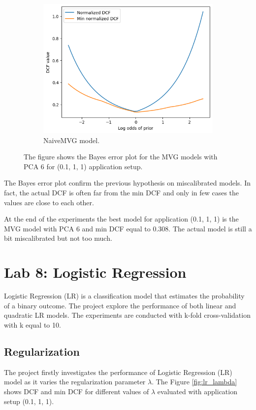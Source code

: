 \documentclass{article}
\begin{document}
\begin{figure}[ht]
\begin{subfigure}[b]{0.3\textwidth}
        \includegraphics[width=\textwidth]{images/mvg_bayes_error_naive.png}
        \caption{NaiveMVG model.}
    \end{subfigure}
    \caption{The figure shows the Bayes error plot for the MVG models with PCA 6 for (0.1, 1, 1) application setup.}
    \label{fig:mvg_bayes_error}
\end{figure}

The Bayes error plot confirm the previous hypothesis on miscalibrated models. In fact, the actual DCF is often far from the min DCF and only in few cases the values are close to each other. 

At the end of the experiments the best model for application (0.1, 1, 1) is the MVG model with PCA 6 and min DCF equal to 0.308. The actual model is still a bit miscalibrated but not too much.

\section{Lab 8: Logistic Regression}
\label{sec:logistic_regression}
Logistic Regression (LR) is a classification model that estimates the probability of a binary outcome. The project explore the performance of both linear and quadratic LR models. The experiments are conducted with k-fold cross-validation with k equal to 10. 

\subsection{Regularization}
The project firstly investigates the performance of Logistic Regression (LR) model as it varies the regularization parameter $\lambda$. The Figure \ref{fig:lr_lambda} shows DCF and min DCF for different values of $\lambda$ evaluated with application setup (0.1, 1, 1).
\end{document}
